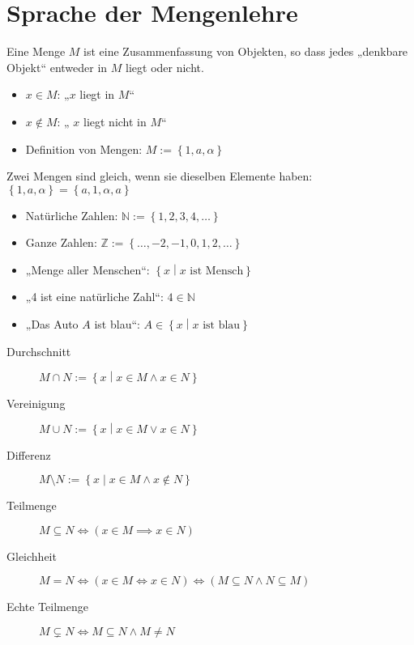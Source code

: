 \section{Sprache der Mengenlehre}
\begin{definition}
  Eine Menge $M$ ist eine Zusammenfassung von Objekten, so dass jedes „denkbare Objekt“ entweder in $M$ liegt oder nicht.
\end{definition}

\begin{itemize}
\item $x \in M$: „$x$ liegt in $M$“
\item $x \not\in M$: „ $x$ liegt nicht in $M$“
\item Definition von Mengen: $M := \left\{ 1, a, \alpha \right\}$
\end{itemize}

Zwei Mengen sind gleich, wenn sie dieselben Elemente haben: $\left\{ 1, a, \alpha \right\} = \left\{ a, 1, \alpha, a \right\}$

\begin{example}
  \begin{itemize}
  \item Natürliche Zahlen: $\mathbb{N} := \left\{ 1, 2, 3, 4, \dots \right\}$
  \item Ganze Zahlen: $\mathbb{Z} := \left\{ \dots, -2, -1, 0, 1, 2, \dots \right\}$
  \item „Menge aller Menschen“: $\left\{ x \middle| x \text{ ist Mensch} \right\}$
  \item „4 ist eine natürliche Zahl“: $4 \in \mathbb{N}$
  \item „Das Auto $A$ ist blau“: $A \in \left\{ x \middle| x \text{ ist blau} \right\}$
  \end{itemize}
\end{example}

\begin{definition}[Mengenoperationen]
  \begin{description}
  \item[Durchschnitt] $M \cap N := \left\{ x \middle| x \in M \wedge x \in N \right\}$
  \item[Vereinigung] $M \cup N := \left\{ x \middle| x \in M \vee x \in N \right\}$
  \item[Differenz] $M \setminus N := \left\{ x \middle| x \in M \wedge x \not\in N \right\}$
  \item[Teilmenge] $M \subseteq N \iff (x \in M \implies x \in N)$
  \item[Gleichheit] $M = N \iff (x \in M \iff x \in N) \iff (M \subseteq N \wedge N \subseteq M)$
  \item[Echte Teilmenge] $M \subsetneq N \iff M \subseteq N \wedge M \neq N$
  \end{description}
\end{definition}

